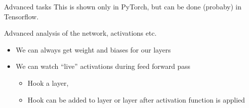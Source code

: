 \documentclass{beamer}%
\theoremstyle{definition}
\theoremstyle{definition}
\theoremstyle{example}
\theoremstyle{example}
\begin{document}
\begin{frame}{Advanced tasks}
This is shown only in PyTorch, but can be done (probaby) in Tensorflow.

Advanced analysis of the network, activations etc.
\begin{itemize}
\item We can always get weight and biases for our layers
\item We can watch ``live'' activations during feed forward pass
\begin{itemize}
\item Hook a layer,
\item Hook can be added to layer or layer after activation function is applied
\end{itemize}
\end{itemize}

\end{frame}
\end{document}
